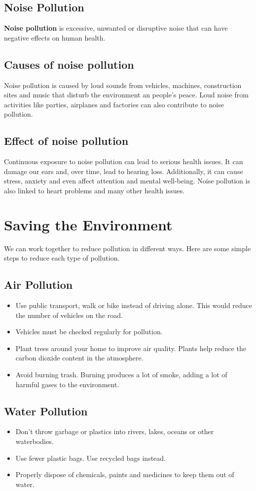 \subsection{Noise Pollution}
\textbf{Noise pollution} is excessive, unwanted or disruptive noise that can have negative effects on human health.
\subsection{\textbf{Causes of noise pollution}}
Noise pollution is caused by loud sounds from vehicles, machines, construction sites and music that disturb the environment an people's peace. Loud noise from activities like parties, airplanes and factories can also contribute to noise pollution.
\subsection{\textbf{Effect of noise pollution}}
Continuous exposure to noise pollution can lead to serious health issues. It can damage our ears and, over time, lead to hearing loss. Additionally, it can cause stress, anxiety and even affect attention and mental well-being. Noise pollution is also linked to heart problems and many other health issues.
\vspace{1.6in}
\section{Saving the Environment}
We can work together to reduce pollution in different ways. Here are some simple steps to reduce each type of pollution.
\subsection{Air Pollution}
\begin{itemize}
    \item Use public transport, walk or bike instead of driving alone. This would reduce the number of vehicles on the road.
    \item Vehicles must be checked regularly for pollution.
    \item Plant trees around your home to improve air quality. Plants help reduce the carbon dioxide content in the atmosphere.
    \item Avoid burning trash. Burning produces a lot of smoke, adding a lot of harmful gases to the environment.
\end{itemize}
\subsection{Water Pollution}
\begin{itemize}
    \item Don't throw garbage or plastics into rivers, lakes, oceans or other waterbodies.
    \item Use fewer plastic bags. Use recycled bags instead.
    \item Properly dispose of chemicals, paints and medicines to keep them out of water.
\end{itemize}
